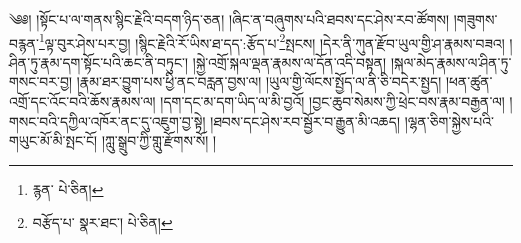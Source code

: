 \setcounter{footnote}{0} 
༄༅། །སྟོང་པ་ལ་གནས་སྙིང་རྗེའི་བདག་ཉིད་ཅན། །ཞིང་ན་བཞུགས་པའི་ཐབས་དང་ཤེས་རབ་ཚོགས། །གཟུགས་བརྙན་\footnote{རྙན་  པེ་ཅིན། }ལྟ་བུར་ཤེས་པར་བྱ། །སྙིང་རྗེའི་རོ་ཡིས་ཐ་དད་:རྩོད་པ་\footnote{བརྩོད་པ་  སྣར་ཐང་།  པེ་ཅིན། }སྤངས། །དེར་ནི་ཀུན་རྫོབ་ཡུལ་གྱི་ཤ་རྣམས་བཟའ། །ཤིན་ཏུ་རྣམ་དག་སྟོང་པའི་ཆང་ནི་བཏུང་། །སྐྱེ་འགྲོ་སྐལ་ལྡན་རྣམས་ལ་དོན་འདི་བསྟན། །སྐལ་མེད་རྣམས་ལ་ཤིན་ཏུ་གསང་བར་བྱ། །རྣམ་ཐར་བྱུག་པས་ཕྱི་ནང་བརླན་བྱས་ལ། །ཡུལ་གྱི་ལོངས་སྤྱོད་ལ་ནི་ཅི་བདེར་སྤྱད། །ཕན་ཚུན་འགྲོ་དང་འོང་བའི་ཆོས་རྣམས་ལ། །དག་དང་མ་དག་ཡིད་ལ་མི་བྱའོ། །བྱང་ཆུབ་སེམས་ཀྱི་ཕྲེང་བས་རྣམ་བརྒྱན་ལ། །གསང་བའི་དཀྱིལ་འཁོར་ནང་དུ་འཇུག་བྱ་སྟེ། །ཐབས་དང་ཤེས་རབ་སྦྱོར་བ་རྒྱུན་མི་འཆད། །ལྷན་ཅིག་སྐྱེས་པའི་གཡུང་མོ་མི་སྤང་ངོ། །ཀླུ་སྒྲུབ་ཀྱི་གླུ་རྫོགས་སོ། ། 